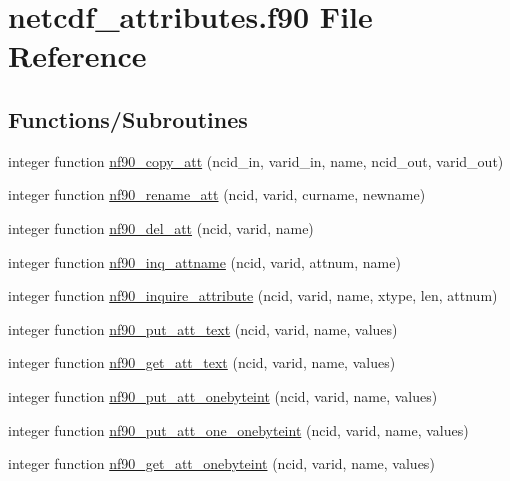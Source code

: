 \hypertarget{netcdf__attributes_8f90}{}\section{netcdf\+\_\+attributes.\+f90 File Reference}
\label{netcdf__attributes_8f90}
\subsection*{Functions/\+Subroutines}
\begin{DoxyCompactItemize}
\item 
integer function \hyperlink{netcdf__attributes_8f90_a42bb0b2dd7b076dbce30dfa444cd6da4}{nf90\+\_\+copy\+\_\+att} (ncid\+\_\+in, varid\+\_\+in, name, ncid\+\_\+out, varid\+\_\+out)
\item 
integer function \hyperlink{netcdf__attributes_8f90_ad51adff25be3d5ed90fd323c3fbcab5c}{nf90\+\_\+rename\+\_\+att} (ncid, varid, curname, newname)
\item 
integer function \hyperlink{netcdf__attributes_8f90_a27a298344fcf932fe450ff4d7a070ceb}{nf90\+\_\+del\+\_\+att} (ncid, varid, name)
\item 
integer function \hyperlink{netcdf__attributes_8f90_a16736efbe930d375cd123601cbbd309e}{nf90\+\_\+inq\+\_\+attname} (ncid, varid, attnum, name)
\item 
integer function \hyperlink{netcdf__attributes_8f90_a659f290308e8a5d27164dc45b0454bac}{nf90\+\_\+inquire\+\_\+attribute} (ncid, varid, name, xtype, len, attnum)
\item 
integer function \hyperlink{netcdf__attributes_8f90_ae6c36726624981e3569535e3871f1c8b}{nf90\+\_\+put\+\_\+att\+\_\+text} (ncid, varid, name, values)
\item 
integer function \hyperlink{netcdf__attributes_8f90_a5acc2fbd09dfc89f50df32aea2ee5d53}{nf90\+\_\+get\+\_\+att\+\_\+text} (ncid, varid, name, values)
\item 
integer function \hyperlink{netcdf__attributes_8f90_a18791f910f99beacee5782fb4f6d4337}{nf90\+\_\+put\+\_\+att\+\_\+onebyteint} (ncid, varid, name, values)
\item 
integer function \hyperlink{netcdf__attributes_8f90_a1a6df85081965c935e1bee17aa5fdcaf}{nf90\+\_\+put\+\_\+att\+\_\+one\+\_\+onebyteint} (ncid, varid, name, values)
\item 
integer function \hyperlink{netcdf__attributes_8f90_adecd3d01fbb8ee879340d3e87125fa56}{nf90\+\_\+get\+\_\+att\+\_\+onebyteint} (ncid, varid, name, values)

\end{DoxyCompactItemize}
